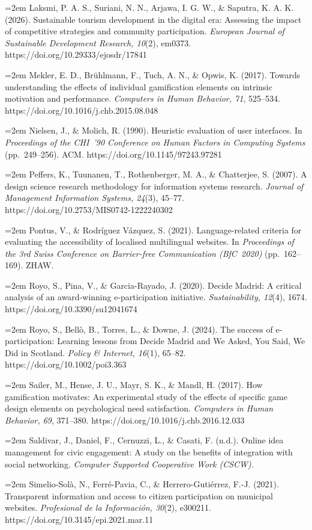 \documentclass[11pt,a4paper]{article}
\newcommand{\refitem}[1]{\noindent\hangindent=2em\hangafter=1 #1\par\smallskip}
\begin{document}
\refitem{Laksmi, P. A. S., Suriani, N. N., Arjawa, I. G. W., \& Saputra, K. A. K. (2026). Sustainable tourism development in the digital era: Assessing the impact of competitive strategies and community participation. \emph{European Journal of Sustainable Development Research, 10}(2), em0373. https://doi.org/10.29333/ejosdr/17841}
\refitem{Mekler, E. D., Br\"uhlmann, F., Tuch, A. N., \& Opwis, K. (2017). Towards understanding the effects of individual gamification elements on intrinsic motivation and performance. \emph{Computers in Human Behavior, 71}, 525--534. https://doi.org/10.1016/j.chb.2015.08.048}
\refitem{Nielsen, J., \& Molich, R. (1990). Heuristic evaluation of user interfaces. In \emph{Proceedings of the CHI~'90 Conference on Human Factors in Computing Systems} (pp.~249--256). ACM. https://doi.org/10.1145/97243.97281}
\refitem{Peffers, K., Tuunanen, T., Rothenberger, M. A., \& Chatterjee, S. (2007). A design science research methodology for information systems research. \emph{Journal of Management Information Systems, 24}(3), 45--77. https://doi.org/10.2753/MIS0742-1222240302}
\refitem{Pontus, V., \& Rodr\'iguez V\'azquez, S. (2021). Language-related criteria for evaluating the accessibility of localised multilingual websites. In \emph{Proceedings of the 3rd Swiss Conference on Barrier-free Communication (BfC~2020)} (pp.~162--169). ZHAW.}
\refitem{Royo, S., Pina, V., \& Garcia-Rayado, J. (2020). Decide Madrid: A critical analysis of an award-winning e-participation initiative. \emph{Sustainability, 12}(4), 1674. https://doi.org/10.3390/su12041674}
\refitem{Royo, S., Bell\`o, B., Torres, L., \& Downe, J. (2024). The success of e-participation: Learning lessons from Decide Madrid and We Asked, You Said, We Did in Scotland. \emph{Policy \& Internet, 16}(1), 65--82. https://doi.org/10.1002/poi3.363}
\refitem{Sailer, M., Hense, J. U., Mayr, S. K., \& Mandl, H. (2017). How gamification motivates: An experimental study of the effects of specific game design elements on psychological need satisfaction. \emph{Computers in Human Behavior, 69}, 371--380. https://doi.org/10.1016/j.chb.2016.12.033}
\refitem{Saldivar, J., Daniel, F., Cernuzzi, L., \& Casati, F. (n.d.). Online idea management for civic engagement: A study on the benefits of integration with social networking. \emph{Computer Supported Cooperative Work (CSCW).}}
\refitem{Simelio-Sol\`a, N., Ferr\'e-Pavia, C., \& Herrero-Guti\'errez, F.-J. (2021). Transparent information and access to citizen participation on municipal websites. \emph{Profesional de la Informaci\'on, 30}(2), e300211. https://doi.org/10.3145/epi.2021.mar.11}
\end{document}
